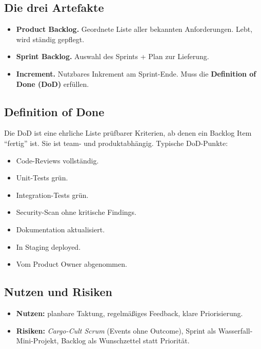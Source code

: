 \documentclass[11pt,a4paper,oneside]{article}
\newcommand{\fachbegriff}[1]{\textbf{#1}}
\begin{document}
\subsection{Die drei Artefakte}

\begin{itemize}
  \item \fachbegriff{Product Backlog.} Geordnete Liste aller bekannten Anforderungen. Lebt, wird ständig gepflegt.
  \item \fachbegriff{Sprint Backlog.} Auswahl des Sprints + Plan zur Lieferung.
  \item \fachbegriff{Increment.} Nutzbares Inkrement am Sprint-Ende. Muss die \fachbegriff{Definition of Done (DoD)} erfüllen.
\end{itemize}

\subsection{Definition of Done}

Die DoD ist eine ehrliche Liste prüfbarer Kriterien, ab denen ein Backlog Item ``fertig'' ist. Sie ist team- und produktabhängig. Typische DoD-Punkte:

\begin{itemize}
  \item Code-Reviews vollständig.
  \item Unit-Tests grün.
  \item Integration-Tests grün.
  \item Security-Scan ohne kritische Findings.
  \item Dokumentation aktualisiert.
  \item In Staging deployed.
  \item Vom Product Owner abgenommen.
\end{itemize}

\subsection{Nutzen und Risiken}

\begin{itemize}
  \item \textbf{Nutzen:} planbare Taktung, regelmäßiges Feedback, klare Priorisierung.
  \item \textbf{Risiken:} \emph{Cargo-Cult Scrum} (Events ohne Outcome), Sprint als Wasserfall-Mini-Projekt, Backlog als Wunschzettel statt Priorität.
\end{itemize}
\end{document}
